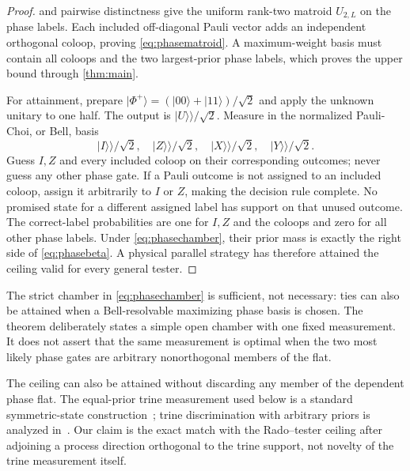\documentclass[11pt]{article}
\theoremstyle{definition}
\theoremstyle{remark}
\newcommand{\ket}[1]{\lvert #1\rangle}
\newcommand{\vket}[1]{\lvert #1\rangle\!\rangle}
\begin{document}
\begin{proof}
 and pairwise distinctness give the uniform
rank-two matroid \(U_{2,L}\) on the phase labels.  Each included off-diagonal
Pauli vector adds an independent orthogonal coloop, proving
\cref{eq:phasematroid}.  A maximum-weight basis must contain all coloops and
the two largest-prior phase labels, which proves the upper bound through
\cref{thm:main}.

For attainment, prepare
\(\ket{\Phi^+}=(\ket{00}+\ket{11})/\sqrt2\) and apply the unknown unitary to
one half.  The output is \(\vket U/\sqrt2\).  Measure in the normalized
Pauli-Choi, or Bell, basis
\[
 \vket I/\sqrt2,\quad \vket Z/\sqrt2,\quad
 \vket X/\sqrt2,\quad \vket Y/\sqrt2.
\]
Guess \(I,Z\) and every included coloop on their corresponding outcomes;
never guess any other phase gate.  If a Pauli outcome is not assigned to an
included coloop, assign it arbitrarily to \(I\) or \(Z\), making the decision
rule complete.  No promised state for a different assigned label has support
on that unused outcome.  The correct-label probabilities are one for
\(I,Z\) and the coloops and zero for all other phase labels.  Under
\cref{eq:phasechamber}, their prior mass is exactly the right side of
\cref{eq:phasebeta}.  A physical parallel strategy has therefore attained the
ceiling valid for every general tester.
\end{proof}

The strict chamber in \cref{eq:phasechamber} is sufficient, not necessary:
ties can also be attained when a Bell-resolvable maximizing phase basis is
chosen.  The theorem deliberately states a simple open chamber with one fixed
measurement.  It does not assert that the same measurement is optimal when
the two most likely phase gates are arbitrary nonorthogonal members of the
flat.

The ceiling can also be attained without discarding any member of the
dependent phase flat.  The equal-prior trine measurement used below is a
standard symmetric-state construction~\cite{ban1997,eldarforney2001}; trine
discrimination with arbitrary priors is analyzed in~\cite{weir2018}.  Our
claim is the exact match with the Rado--tester ceiling after adjoining a
process direction orthogonal to the trine support, not novelty of the trine
measurement itself.
\end{document}
